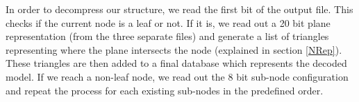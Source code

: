 In order to decompress our structure, we read the first bit of the output file. This checks if the current node is a leaf or not. If it is, we read out a 20 bit plane representation (from the three separate files) and generate a list of triangles representing where the plane intersects the node (explained in section \ref{NRep}). These triangles are then added to a final database which represents the decoded model. If we reach a non-leaf node, we read out the 8 bit sub-node configuration and repeat the process for each existing sub-nodes in the predefined order. \\  
